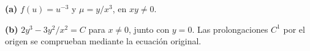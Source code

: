 \noindent\textbf{(a)} $f(u)=u^{-3}$ y $\mu=y/x^3$, en $xy\ne0$.

\noindent\textbf{(b)} $2y^3-3y^2/x^2=C$ para $x\ne0$, junto con $y=0$. Las prolongaciones $C^1$ por el origen se comprueban mediante la ecuación original.
